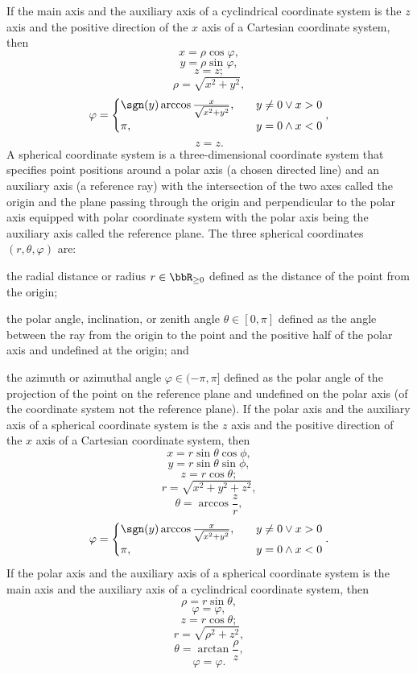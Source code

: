 \documentclass[a4paper,12pt]{report}
\begin{document}
\eit
If the main axis and the auxiliary axis of a cyclindrical coordinate system is the $z$ axis and the positive direction of the $x$ axis of a Cartesian coordinate system, then
\[x=\rho\cos\varphi,\]
\[y=\rho\sin\varphi,\]
\[z=z;\]
\[\rho=\sqrt{x^2+y^2},\]
\[\varphi=\begin{cases}\sgn(y)\arccos\frac{x}{\sqrt{x^2+y^2}},\quad&y\neq 0\lor x>0\\\pi,\quad&y=0\land x<0\end{cases},\]
\[z=z.\]
A spherical coordinate system is a three-dimensional coordinate system that specifies point positions around a polar axis (a chosen directed line) and an auxiliary axis (a reference ray) with the intersection of the two axes called the origin and the plane passing through the origin and perpendicular to the polar axis equipped with polar coordinate system with the polar axis being the auxiliary axis called the reference plane. The three spherical coordinates $(r,\theta,\varphi)$ are:
\bit
\item the radial distance or radius $r\in\bbR_{\geq 0}$ defined as the distance of the point from the origin;
\item the polar angle, inclination, or zenith angle $\theta\in[0,\pi]$ defined as the angle between the ray from the origin to the point and the positive half of the polar axis and undefined at the origin; and
\item the azimuth or azimuthal angle $\varphi\in(-\pi,\pi]$ defined as the polar angle of the projection of the point on the reference plane and undefined on the polar axis (of the coordinate system not the reference plane).
\eit
If the polar axis and the auxiliary axis of a spherical coordinate system is the $z$ axis and the positive direction of the $x$ axis of a Cartesian coordinate system, then
\[x=r\sin\theta\cos\phi,\]
\[y=r\sin\theta\sin\phi,\]
\[z=r\cos\theta;\]
\[r=\sqrt{x^2+y^2+z^2},\]
\[\theta=\arccos\frac{z}{r},\]
\[\varphi=\begin{cases}\sgn(y)\arccos\frac{x}{\sqrt{x^2+y^2}},\quad&y\neq 0\lor x>0\\\pi,\quad&y=0\land x<0\end{cases}.\]
If the polar axis and the auxiliary axis of a spherical coordinate system is the main axis and the auxiliary axis of a cyclindrical coordinate system, then
\[\rho=r\sin\theta,\]
\[\varphi=\varphi,\]
\[z=r\cos\theta;\]
\[r=\sqrt{\rho^2+z^2},\]
\[\theta=\arctan\frac{\rho}{z},\]
\[\varphi=\varphi.\]
\end{document}
